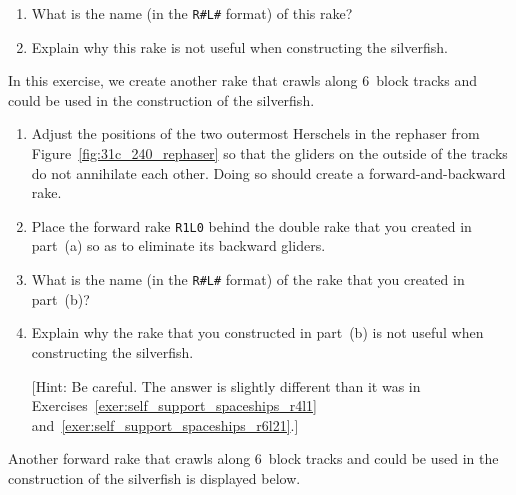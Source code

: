 \begin{multicols}{2}
\begin{problem}
		\begin{enumerate}[label=\bf\color{ocre}(\alph*)]
			\item What is the name (in the \texttt{R\#L\#} format) of this rake?
			
			\item Explain why this rake is not useful when constructing the silverfish.
		\end{enumerate}
	\end{problem}
	
	
	\mfilbreak
	
	
	\begin{problemstar}\label{exer:self_support_spaceships_r2l16}
		In this exercise, we create another rake that crawls along $6$~block tracks and could be used in the construction of the silverfish.
		
		\begin{enumerate}[label=\bf\color{ocre}(\alph*)]
			\item Adjust the positions of the two outermost Herschels in the rephaser from Figure~\ref{fig:31c_240_rephaser} so that the gliders on the outside of the tracks do not annihilate each other. Doing so should create a forward-and-backward rake.
			
			\item Place the forward rake \texttt{R1L0} behind the double rake that you created in part~(a) so as to eliminate its backward gliders.
			
			\item What is the name (in the \texttt{R\#L\#} format) of the rake that you created in part~(b)?
			
			\item Explain why the rake that you constructed in part~(b) is not useful when constructing the silverfish.
			
			[Hint: Be careful. The answer is slightly different than it was in Exercises~\ref{exer:self_support_spaceships_r4l1} and~\ref{exer:self_support_spaceships_r6l21}.]
		\end{enumerate}
	\end{problemstar}
	
	
	
	\mfilbreak
	
	
	\begin{problem}\label{exer:self_support_spaceships_r3l28}
		Another forward rake that crawls along $6$~block tracks and could be used in the construction of the silverfish is displayed below.
		\begin{center}
		\end{center}
		

\end{problem}
\end{multicols}

